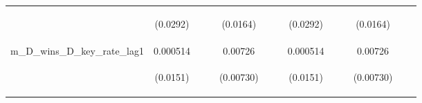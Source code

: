 \documentclass[]{article}
\begin{document}
\begin{center}
\begin{tabular}{lcccccccccccc}
\vspace{4pt} & \begin{footnotesize}(0.0292)\end{footnotesize} & \begin{footnotesize}\end{footnotesize} & \begin{footnotesize}\end{footnotesize} & \begin{footnotesize}(0.0164)\end{footnotesize} & \begin{footnotesize}\end{footnotesize} & \begin{footnotesize}\end{footnotesize} & \begin{footnotesize}(0.0292)\end{footnotesize} & \begin{footnotesize}\end{footnotesize} & \begin{footnotesize}\end{footnotesize} & \begin{footnotesize}(0.0164)\end{footnotesize} & \begin{footnotesize}\end{footnotesize} & \begin{footnotesize}\end{footnotesize} \\
m\_D\_wins\_D\_key\_rate\_lag1 & 0.000514 &  &  & 0.00726 &  &  & 0.000514 &  &  & 0.00726 &  &  \\
\vspace{4pt} & \begin{footnotesize}(0.0151)\end{footnotesize} & \begin{footnotesize}\end{footnotesize} & \begin{footnotesize}\end{footnotesize} & \begin{footnotesize}(0.00730)\end{footnotesize} & \begin{footnotesize}\end{footnotesize} & \begin{footnotesize}\end{footnotesize} & \begin{footnotesize}(0.0151)\end{footnotesize} & \begin{footnotesize}\end{footnotesize} & \begin{footnotesize}\end{footnotesize} & \begin{footnotesize}(0.00730)\end{footnotesize} & \begin{footnotesize}\end{footnotesize} & \begin{footnotesize}\end{footnotesize} \\

\end{tabular}
\end{center}
\end{document}

